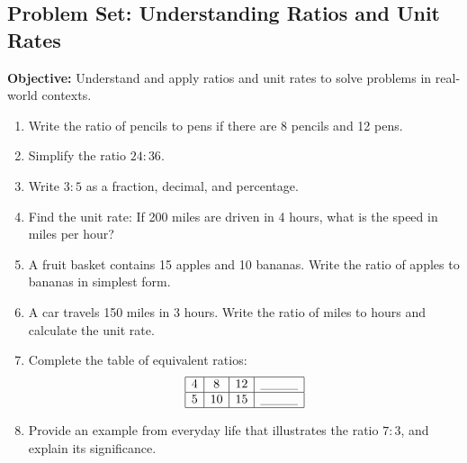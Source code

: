 \documentclass[12pt]{article}
\title{}
\date{}
\begin{document}
\subsection*{Problem Set: Understanding Ratios and Unit Rates}
\onehalfspacing

\begin{tcolorbox}[colframe=black!40, colback=gray!5, 
coltitle=black, colbacktitle=black!20, fonttitle=\bfseries\Large, 
title=Learning Objective, halign title=center, left=5pt, right=5pt, top=5pt, bottom=15pt]
\textbf{Objective:} Understand and apply ratios and unit rates to solve problems in real-world contexts.
\end{tcolorbox}

\begin{tcolorbox}[colframe=black!60, colback=white, 
coltitle=black, colbacktitle=black!15, fonttitle=\bfseries\Large, 
title=Exercises, halign title=center, left=10pt, right=10pt, top=10pt, bottom=60pt]
\begin{enumerate}[itemsep=2.75em]
    \item Write the ratio of pencils to pens if there are 8 pencils and 12 pens.
    \item Simplify the ratio \(24:36\).
    \item Write \(3:5\) as a fraction, decimal, and percentage.
    \item Find the unit rate: If 200 miles are driven in 4 hours, what is the speed in miles per hour?
    \item A fruit basket contains 15 apples and 10 bananas. Write the ratio of apples to bananas in simplest form.
    \item A car travels 150 miles in 3 hours. Write the ratio of miles to hours and calculate the unit rate.
    \item Complete the table of equivalent ratios:
    \[
    \begin{array}{|c|c|c|c|}
    \hline
    4 & 8 & 12 & \_\_\_\_ \\
    \hline
    5 & 10 & 15 & \_\_\_\_ \\
    \hline
    \end{array}
    \]
    \item Provide an example from everyday life that illustrates the ratio 
\( 7:3 \), and explain its significance.
\end{enumerate}
\end{tcolorbox}
\end{document}
